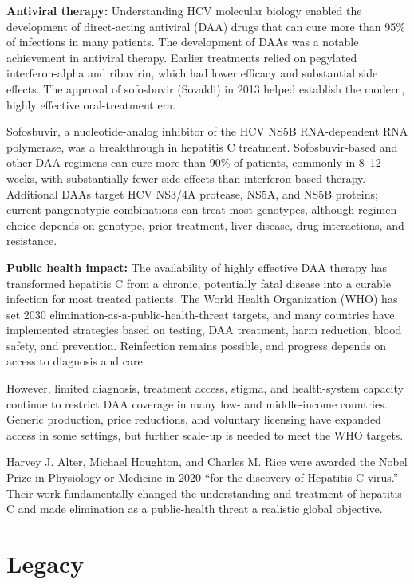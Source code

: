 \textbf{Antiviral therapy:} Understanding HCV molecular biology enabled the development of direct-acting antiviral (DAA) drugs that can cure more than 95\% of infections in many patients. The development of DAAs was a notable achievement in antiviral therapy. Earlier treatments relied on pegylated interferon-alpha and ribavirin, which had lower efficacy and substantial side effects. The approval of sofosbuvir (Sovaldi) in 2013 helped establish the modern, highly effective oral-treatment era.

Sofosbuvir, a nucleotide-analog inhibitor of the HCV NS5B RNA-dependent RNA polymerase, was a breakthrough in hepatitis C treatment. Sofosbuvir-based and other DAA regimens can cure more than 90\% of patients, commonly in 8--12 weeks, with substantially fewer side effects than interferon-based therapy. Additional DAAs target HCV NS3/4A protease, NS5A, and NS5B proteins; current pangenotypic combinations can treat most genotypes, although regimen choice depends on genotype, prior treatment, liver disease, drug interactions, and resistance.

\textbf{Public health impact:} The availability of highly effective DAA therapy has transformed hepatitis C from a chronic, potentially fatal disease into a curable infection for most treated patients. The World Health Organization (WHO) has set 2030 elimination-as-a-public-health-threat targets, and many countries have implemented strategies based on testing, DAA treatment, harm reduction, blood safety, and prevention. Reinfection remains possible, and progress depends on access to diagnosis and care.

However, limited diagnosis, treatment access, stigma, and health-system capacity continue to restrict DAA coverage in many low- and middle-income countries. Generic production, price reductions, and voluntary licensing have expanded access in some settings, but further scale-up is needed to meet the WHO targets.

Harvey J. Alter, Michael Houghton, and Charles M. Rice were awarded the Nobel Prize in Physiology or Medicine in 2020 ``for the discovery of Hepatitis C virus.'' Their work fundamentally changed the understanding and treatment of hepatitis C and made elimination as a public-health threat a realistic global objective.

\section{Legacy}


